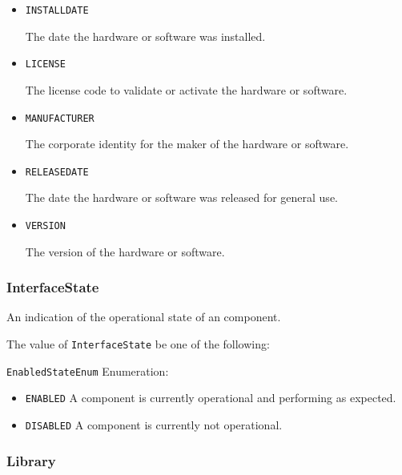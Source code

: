 \begin{itemize}

\item \texttt{INSTALL\textunderscore DATE}


The date the hardware or software was installed.

\item \texttt{LICENSE}


The license code to validate or activate the hardware or software.

\item \texttt{MANUFACTURER}


The corporate identity for the maker of the hardware or software.


\item \texttt{RELEASE\textunderscore DATE}


The date the hardware or software was released for general use.


\item \texttt{VERSION}


The version of the hardware or software.


\end{itemize}








\subsubsection{InterfaceState}




An indication of the operational state of an  component.


The value of \texttt{InterfaceState} \MUST be one of the following: 


\texttt{EnabledStateEnum} Enumeration:

\begin{itemize}
\item \texttt{ENABLED} \newline A component is currently operational and performing as expected. 
\item \texttt{DISABLED} \newline A component is currently not operational. 
\end{itemize}



\subsubsection{Library}
\label{sec:Library}



